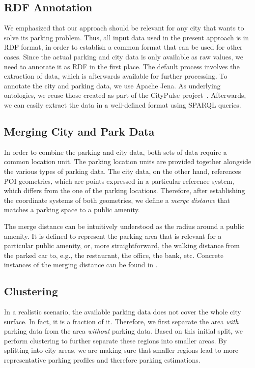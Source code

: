 \subsection{RDF Annotation}
We emphasized that our approach should be relevant for any city that wants to solve its parking problem. Thus, all input data used in the present approach is in RDF format, in order to establish a common format that can be used for other cases.
Since the actual parking and city data is only available as raw values, we need to annotate it as RDF in the first place.
The default process involves the extraction of data, which is afterwards available for further processing. To annotate the city and parking data, we use Apache Jena. As underlying ontologies, we reuse those created as part of the CityPulse project~\cite{city_pulse}. Afterwards, we can easily extract the data in a well-defined format using SPARQL queries. 

\subsection{Merging City and Park Data}
In order to combine the parking and city data, both sets of data require a common location unit. 
The parking location units are provided together alongside the various types of parking data. 
The city data, on the other hand, references POI geometries, which are points expressed in a particular reference system, which differs from the one of the parking locations.
Therefore, after establishing the coordinate systems of both geometries, we define a \textit{merge distance} that matches a parking space to a public amenity. 

The merge distance can be intuitively understood as the radius around a public amenity. It is defined to represent the parking area that is relevant for a particular public amenity, or, more straightforward, the walking distance from the parked car to, e.g., the restaurant, the office, the bank, etc. Concrete instances of the merging distance can be found in .

\subsection{Clustering}
\label{concept:clustering}
In a realistic scenario, the available parking data does not cover the whole city surface. In fact, it is a fraction of it. Therefore, we first separate the area \textit{with} parking data from the area \textit{without} parking data. Based on this initial split, we perform clustering to further separate these regions into smaller areas. By splitting into city areas, we are making sure that smaller regions lead to more representative parking profiles and therefore parking estimations. 

